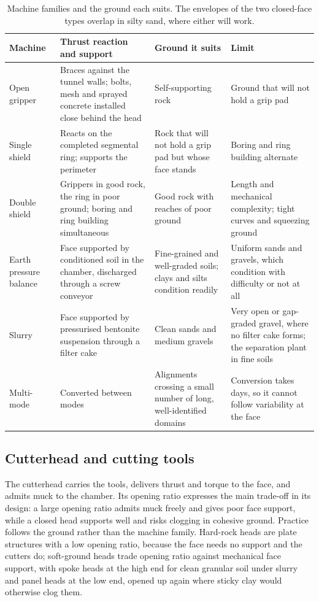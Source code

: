 \begin{table}[htbp]
\caption{Machine families and the ground each suits. The envelopes of the two closed-face types overlap in silty sand, where either will work.}
\label{tab:machine-selection}
\centering
\small
\begin{tabularx}{\textwidth}{@{}>{\RaggedRight\arraybackslash}p{} Y Y Y@{}}
\toprule
\textbf{Machine} & \textbf{Thrust reaction and support} & \textbf{Ground it suits} & \textbf{Limit} \\
\midrule
Open gripper & Braces against the tunnel walls; bolts, mesh and sprayed concrete installed close behind the head & Self-supporting rock & Ground that will not hold a grip pad \\
Single shield & Reacts on the completed segmental ring; supports the perimeter & Rock that will not hold a grip pad but whose face stands & Boring and ring building alternate \\
Double shield & Grippers in good rock, the ring in poor ground; boring and ring building simultaneous & Good rock with reaches of poor ground & Length and mechanical complexity; tight curves and squeezing ground \\
Earth pressure balance & Face supported by conditioned soil in the chamber, discharged through a screw conveyor & Fine-grained and well-graded soils; clays and silts condition readily & Uniform sands and gravels, which condition with difficulty or not at all \\
Slurry & Face supported by pressurised bentonite suspension through a filter cake & Clean sands and medium gravels & Very open or gap-graded gravel, where no filter cake forms; the separation plant in fine soils \\
Multi-mode & Converted between modes & Alignments crossing a small number of long, well-identified domains & Conversion takes days, so it cannot follow variability at the face \\
\bottomrule
\end{tabularx}
\end{table}

\subsection{Cutterhead and cutting tools}
\label{sec:cutterhead-tools}

The cutterhead carries the tools, delivers thrust and torque to the face, and
admits muck to the chamber. Its opening ratio expresses the main trade-off
in its design: a large opening ratio admits muck freely and gives poor face
support, while a closed head supports well and risks clogging in cohesive
ground. Practice follows the ground rather than the machine family. Hard-rock heads
are plate structures with a low opening ratio, because the face needs no
support and the cutters do; soft-ground heads trade opening ratio against
mechanical face support, with spoke heads at the high end for clean granular
soil under slurry and panel heads at the low end, opened up again where
sticky clay would otherwise clog them.

